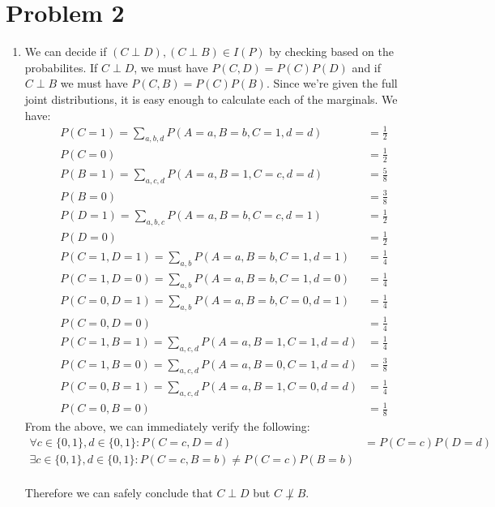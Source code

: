 \documentclass[12pt]{article}
\begin{document}
\section*{Problem 2}

\begin{enumerate}[label=(\alph*)]
\item We can decide if $(C \perp D), (C \perp B) \in I(P)$ by checking based on the probabilites. If $C \perp D$, we must have $P(C,D) = P(C)P(D)$ and if $C \perp B$ we must have $P(C,B) = P(C)P(B)$. Since we're given the full joint distributions, it is easy enough to calculate each of the marginals. We have:
\begin{align*}
&P(C = 1) = \sum_{a,b,d} P(A = a, B=b, C=1, d=d) &= \frac{1}{2}\\
&P(C = 0) &= \frac{1}{2} \\
&P(B = 1) =\sum_{a,c,d} P(A = a, B=1, C=c, d=d) &= \frac{5}{8} \\
&P(B = 0) &= \frac{3}{8} \\
&P(D = 1) =\sum_{a,b,c} P(A = a, B=b, C=c, d=1)&= \frac{1}{2} \\ 
&P(D = 0) &= \frac{1}{2} \\ 
&P(C = 1, D = 1) = \sum_{a,b} P(A = a, B=b, C=1, d=1) &= \frac{1}{4} \\
&P(C = 1, D = 0) = \sum_{a,b} P(A = a, B=b, C=1, d=0) &= \frac{1}{4} \\
&P(C = 0, D = 1) = \sum_{a,b} P(A = a, B=b, C=0, d=1) &= \frac{1}{4} \\
&P(C = 0, D = 0) &= \frac{1}{4} \\
&P(C = 1, B = 1) =\sum_{a,c,d} P(A = a, B=1, C=1, d=d) &= \frac{1}{4} \\
&P(C = 1, B = 0) =\sum_{a,c,d} P(A = a, B=0, C=1, d=d) &= \frac{3}{8} \\
&P(C = 0, B = 1) =\sum_{a,c,d} P(A = a, B=1, C=0, d=d) &= \frac{1}{4} \\
&P(C = 0, B = 0) &= \frac{1}{8} 
\end{align*}
From the above, we can immediately verify the following:
\begin{align*}
\forall c \in \{0,1\},d \in \{0,1\}: P(C =c, D=d) &= P(C=c)P(D=d) \\
\exists c \in \{0,1\},d \in \{0,1\}: P(C = c, B =b) \neq P(C = c) P(B = b) \\
\end{align*}

Therefore we can safely conclude that $C \perp D$ but $C \not\perp B$.


\end{enumerate}
\end{document}
